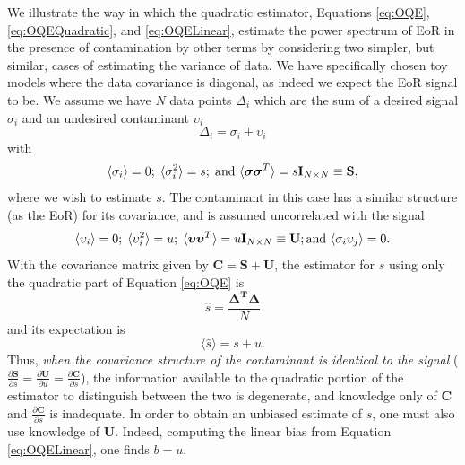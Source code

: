 \documentclass[preprint2,numberedappendix,tighten]{aastex6}  %
\newcommand{\C}{\mathbf{C}}
\newcommand{\PDeriv}[2]{\ensuremath{\frac{\partial #1}{\partial #2}}}
\begin{document}
We illustrate the way in which the quadratic estimator, Equations \eqref{eq:OQE}, \eqref{eq:OQEQuadratic}, and \eqref{eq:OQELinear}, estimate the power spectrum of EoR in the presence of contamination by other terms by considering two simpler, but similar, cases of estimating the variance of data.  We have specifically chosen toy models where the data covariance is diagonal, as indeed we expect the EoR signal to be.  We assume we have $N$ data points $\Delta_i$ which are the sum of a desired signal $\sigma_i$ and an undesired contaminant $\upsilon_i$
\begin{equation}
\Delta_i = \sigma_i + \upsilon_i
\end{equation}
with 
\begin{equation}
\langle \sigma_i \rangle = 0; \; \langle \sigma^2_i \rangle = s; \; {\rm and}~\langle \bm{\sigma \sigma}^T \rangle = s \mathbf{I}_{N \times N} \equiv \mathbf{S},
\end{equation}
where we wish to estimate $s$.  The contaminant in this case has a similar structure (as the EoR) for its covariance, and is assumed uncorrelated with the signal
\begin{equation}
\label{eq:IdealToyModelCovariance}
\langle \upsilon_i \rangle = 0; \; 
\langle \upsilon^2_i \rangle = u; \; 
\langle \bm{\upsilon \upsilon}^T \rangle = u \mathbf{I}_{N \times N} \equiv \mathbf{U}; {\rm and}~ 
\langle \sigma_i \upsilon_j \rangle = 0.
\end{equation}
With the covariance matrix given by $\C = \mathbf{S} + \mathbf{U}$, the estimator for $s$ using only the quadratic part of Equation \ref{eq:OQE} is
\begin{equation}
\label{eq:IdealToyModelEstimator}
\hat{s} = \frac{ \bm{\Delta^T \Delta}}{N} 
\end{equation}
and its expectation is
\begin{equation}
\langle \hat{s} \rangle = s + u.
\end{equation}
Thus, {\it when the covariance structure of the contaminant is identical to the signal} ($\PDeriv{\mathbf{S}}{s} = \PDeriv{\mathbf{U}}{u} =  \PDeriv{\C}{s}$), the information available to the quadratic portion of the estimator to distinguish between the two is degenerate, and knowledge only of $\C$ and $\PDeriv{\C}{s}$ is inadequate.  In order to obtain an unbiased estimate of $s$, one must also use knowledge of $\mathbf{U}$.  Indeed, computing the linear bias from Equation \eqref{eq:OQELinear}, one finds $b = u$.   
\end{document}
